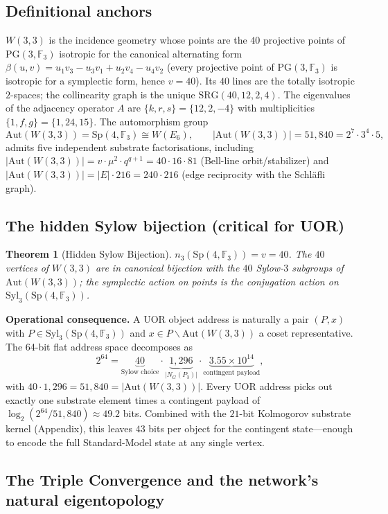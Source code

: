 \documentclass[11pt,letterpaper]{article}
\newtheorem{theorem}{Theorem}
\theoremstyle{remark}
\newcommand{\W}{W(3,3)}
\newcommand{\Sp}{\mathrm{Sp}}
\newcommand{\Aut}{\mathrm{Aut}}
\newcommand{\FF}{\mathbb{F}}
\newcommand{\PG}[2]{\mathrm{PG}(#1,\FF_{#2})}
\newcommand{\SRG}[4]{\mathrm{SRG}(#1,#2,#3,#4)}
\begin{document}
\subsection{Definitional anchors}
$\W$ is the incidence geometry whose points are the $40$ projective points of $\PG{3}{3}$
isotropic for the canonical alternating form $\beta(u,v)=u_1v_3-u_3v_1+u_2v_4-u_4v_2$ (every
projective point of $\PG{3}{3}$ is isotropic for a symplectic form, hence $v=40$). Its
$40$ lines are the totally isotropic $2$-spaces; the collinearity graph is the unique
$\SRG{40}{12}{2}{4}$. The eigenvalues of the adjacency operator $A$ are $\{k,r,s\}=\{12,2,-4\}$
with multiplicities $\{1,f,g\}=\{1,24,15\}$. The automorphism group
\[
\Aut(\W)=\Sp(4,\FF_3)\cong W(E_6),\qquad |\Aut(\W)|=51{,}840 = 2^7\cdot 3^4\cdot 5,
\]
admits five independent substrate factorisations, including
$|\Aut(\W)|=v\cdot\mu^2\cdot q^{q+1}=40\cdot 16\cdot 81$ (Bell-line orbit/stabilizer)
and $|\Aut(\W)|=|E|\cdot 216=240\cdot 216$ (edge reciprocity with the Schl\"afli graph).

\subsection{The hidden Sylow bijection (critical for UOR)}
\label{sec:sylow}

\begin{theorem}[Hidden Sylow Bijection]\label{thm:sylow}
$n_3(\Sp(4,\FF_3))=v=40$. The $40$ vertices of $\W$ are in canonical bijection with the
$40$ Sylow-$3$ subgroups of $\Aut(\W)$; the symplectic action on points is the conjugation
action on $\mathrm{Syl}_3(\Sp(4,\FF_3))$.
\end{theorem}

\noindent\textbf{Operational consequence.} A UOR object address is naturally a pair
$(P, x)$ with $P\in\mathrm{Syl}_3(\Sp(4,\FF_3))$ and $x\in P\backslash \Aut(\W)$ a coset
representative. The 64-bit flat address space decomposes as
\[
2^{64} = \underbrace{40}_{\text{Sylow choice}} \cdot \underbrace{1{,}296}_{|N_G(P_3)|} \cdot
\underbrace{3.55\times 10^{14}}_{\text{contingent payload}},
\]
with $40\cdot 1{,}296 = 51{,}840 = |\Aut(\W)|$. Every UOR address picks out exactly one
substrate element times a contingent payload of $\log_2(2^{64}/51{,}840)\approx 49.2$ bits.
Combined with the $21$-bit Kolmogorov substrate kernel (Appendix), this leaves
$43$ bits per object for the contingent state---enough to encode the full Standard-Model
state at any single vertex.

\subsection{The Triple Convergence and the network's natural eigentopology}
\end{document}
